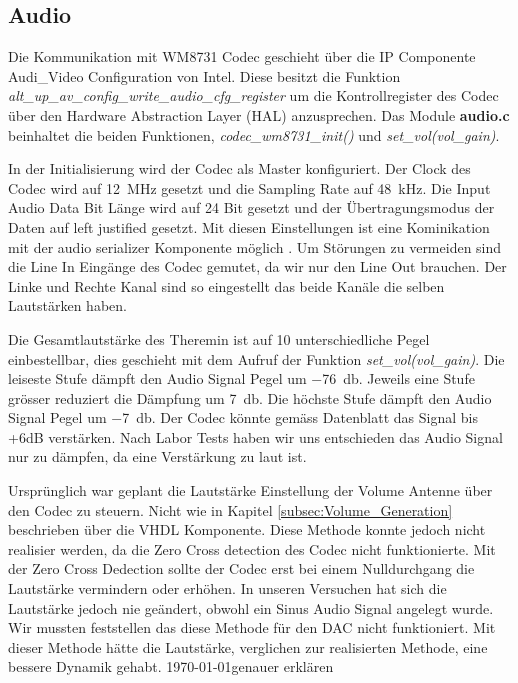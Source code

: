 \subsection{Audio}\label{subsec:audio}

Die Kommunikation mit WM8731 Codec geschieht über die IP Componente Audi\_Video Configuration von Intel. Diese besitzt die Funktion 
\textit{alt\_up\_av\_config\_write\_audio\_cfg\_register} um die Kontrollregister des Codec über den Hardware Abstraction Layer (HAL) anzusprechen\cite{Audio_config}.
Das Module \textbf{audio.c} beinhaltet die beiden Funktionen, \textit{codec\_wm8731\_init()} und \textit{set\_vol(vol\_gain)}. 

In der Initialisierung wird der Codec als Master konfiguriert. Der Clock des Codec wird auf \SI{12}{MHz} gesetzt und die Sampling Rate auf \SI{48}{kHz}. Die Input Audio Data Bit Länge wird auf 24 Bit gesetzt und der Übertragungsmodus der Daten auf left justified gesetzt. Mit diesen Einstellungen ist eine Kominikation mit der audio serializer Komponente möglich .
Um Störungen zu vermeiden sind die Line In Eingänge des Codec gemutet, da wir nur den Line Out brauchen. Der Linke und Rechte Kanal sind so eingestellt das beide Kanäle die selben Lautstärken haben\cite{codec}. 

Die Gesamtlautstärke des Theremin ist auf 10 unterschiedliche Pegel einbestellbar, dies geschieht mit dem Aufruf der Funktion \textit{set\_vol(vol\_gain)}. Die leiseste Stufe dämpft den Audio Signal Pegel um \SI{-76}{db}. Jeweils eine Stufe grösser reduziert die Dämpfung um \SI{7}{db}. Die höchste Stufe dämpft den Audio Signal Pegel um \SI{-7}{db}. Der Codec könnte gemäss Datenblatt das Signal bis +6dB verstärken. Nach Labor Tests haben wir uns entschieden das Audio Signal nur zu dämpfen, da eine Verstärkung zu laut ist.


Ursprünglich war geplant die Lautstärke Einstellung der Volume Antenne über den Codec zu steuern. Nicht wie in Kapitel \ref{subsec:Volume_Generation} beschrieben über die VHDL Komponente. Diese Methode konnte jedoch nicht realisier werden, da die Zero Cross detection des Codec nicht funktionierte. Mit der Zero Cross Dedection sollte der Codec erst bei einem Nulldurchgang die Lautstärke vermindern oder erhöhen. In unseren Versuchen hat sich die Lautstärke jedoch nie geändert, obwohl ein Sinus Audio Signal angelegt wurde. Wir mussten feststellen das diese Methode für den DAC nicht funktioniert. Mit dieser Methode hätte die Lautstärke, verglichen zur realisierten Methode, eine bessere Dynamik gehabt. \today{genauer erklären}